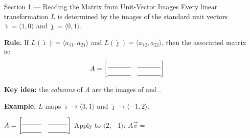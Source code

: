 \documentclass[10pt]{article}
\begin{document}
\begin{notesbox}{Section 1 --- Reading the Matrix from Unit-Vector Images}
\small
Every linear transformation $L$ is determined by the images of the standard unit vectors
$\hat{\imath}=\langle1,0\rangle$ and $\hat{\jmath}=\langle0,1\rangle$.

\vspace{0.06in}
\textbf{Rule.} If $L(\hat{\imath})=\langle a_{11},a_{21}\rangle$ and
$L(\hat{\jmath})=\langle a_{12},a_{22}\rangle$, then the associated matrix is:
\[
  A = \begin{bmatrix} \blank{1.2cm} & \blank{1.2cm} \\ \blank{1.2cm} & \blank{1.2cm} \end{bmatrix}
\]

\vspace{0.04in}
\textbf{Key idea:} the \emph{columns} of $A$ are the images of \blank{2cm} and \blank{2cm}.

\vspace{0.08in}
\textbf{Example.} $L$ maps $\hat{\imath} \to \langle3,1\rangle$ and $\hat{\jmath} \to \langle-1,2\rangle$.

\hspace{1em} $A = \begin{bmatrix} \blank{1cm} & \blank{1cm} \\ \blank{1cm} & \blank{1cm} \end{bmatrix}$
\qquad Apply to $\langle2,-1\rangle$: \; $A\vec v = $ \blank{4cm}
\end{notesbox}

\vspace{0.06in}
\end{document}
